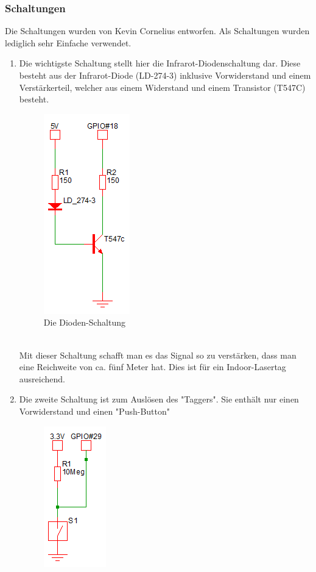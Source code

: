 \newpage
\subsubsection{Schaltungen}

Die Schaltungen wurden von Kevin Cornelius entworfen.
Als Schaltungen wurden lediglich sehr Einfache verwendet. 
\begin{enumerate}
	\item Die wichtigste Schaltung stellt hier die Infrarot-Diodenschaltung dar. Diese besteht aus der Infrarot-Diode (LD-274-3) inklusive Vorwiderstand und einem Verstärkerteil, welcher aus einem Widerstand und einem Transistor (T547C) besteht.\\
	\begin{figure}[h]
		\centering
		\includegraphics[width=0.2 \textwidth]{./040-komponenten/010-hardware/Diodenschaltung.png}
		\caption{Die Dioden-Schaltung}
		\label{fig:Bild2Hardware}
	\end{figure}\\
	Mit dieser Schaltung schafft man es das Signal so zu verstärken, dass man eine Reichweite von ca. fünf Meter hat. Dies ist für ein Indoor-Lasertag ausreichend.\\
	\item Die zweite Schaltung ist zum Auslösen des "Taggers". Sie enthält nur einen Vorwiderstand und einen "Push-Button"\\
	\begin{figure}[h]
		\centering
		\includegraphics[width=0.2 \textwidth]{./040-komponenten/010-hardware/Button.png}

\end{figure}
\end{enumerate}
